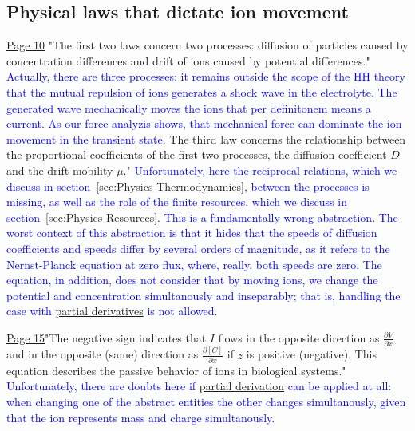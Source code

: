 \subsection{Physical laws that dictate ion movement\label{sec:Physics-PhysicalLaws}}
\href{https://rcweb.dartmouth.edu/~mvdm/wiki/lib/exe/fetch.php?media=analysis:johnstonwu.pdf}{Page 10} "The first two laws concern two processes: diffusion of particles caused
by concentration differences and drift of ions caused by potential differences."
\textcolor{blue}{Actually, there are three processes: it remains outside the scope of the \gls{HH} theory that the mutual repulsion of ions generates a shock wave in the electrolyte. The generated
wave mechanically moves the ions that per definitonem means a current. As our force analyzis shows, that mechanical force
can dominate the ion movement in the transient state.}
 The third law concerns the relationship between the proportional
coefficients of the first two processes, the diffusion coefficient $D$ and the
drift mobility $\mu$." \textcolor{blue}{Unfortunately, here the reciprocal relations, which we discuss in section~\ref{sec:Physics-Thermodynamics}, between the processes is missing, as well as the role of the finite resources, which we
discuss in section~\ref{sec:Physics-Resources}. This is a fundamentally wrong abstraction. The worst context of this abstraction is that it hides that the speeds of diffusion coefficients and speeds differ by several orders of magnitude, as it refers to the Nernst-Planck equation at zero flux, where, really, both speeds are zero. The equation, in addition, does not consider that by moving ions, we change the potential and concentration simultanously and
inseparably; that is, handling the case with \hyperlink{PartialDerivative}{partial derivatives} is not allowed.
}

\href{https://rcweb.dartmouth.edu/~mvdm/wiki/lib/exe/fetch.php?media=analysis:johnstonwu.pdf}{Page 15}"The
negative sign indicates that $I$ flows in the opposite direction as $\frac{\partial V}{\partial x}$ and in
the opposite (same) direction as $\frac{\partial [C]}{\partial x}$
if $z$ is positive (negative).
This equation describes the passive behavior of ions in biological systems."
\textcolor{blue}{Unfortunately, there are doubts here if \hyperlink{PartialDerivative}{partial derivation} can be applied at all: when changing one of the abstract entities the other changes simultanously, given that the ion represents mass and charge simultanously.}

